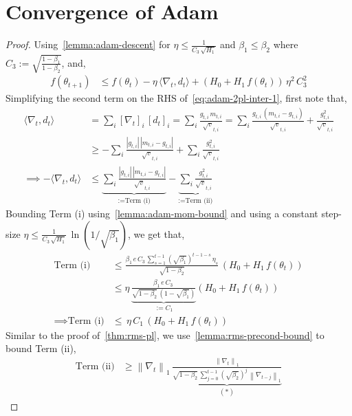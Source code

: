 \documentclass{article}
\newcommand{\ti}[1]{#1_{t,i}}
\newcommand{\norm}[1]{\left\|#1 \right\|}
\newcommand{\tht}{\theta_t}
\newcommand{\thtt}{\theta_{t+1}}
\begin{document}
\section{Convergence of Adam}
\label{app:adam}

\adam*
\begin{proof}
Using~\cref{lemma:adam-descent} for $\eta \leq \frac{1}{C_3 \, \sqrt{H_1}}$ and $\beta_1 \leq \beta_2$ where $C_3 := \sqrt{\frac{1 - \beta_1}{1 - \beta_2}}$, and, 
\begin{align}
f(\thtt) & \leq f(\tht) - \eta \, \langle \nabla_t, d_t \rangle +  \left(H_0 + H_1 \, f(\tht) \right) \, \eta^2 \, C^2_3 \label{eq:adam-2pl-inter-1}    
\end{align}
Simplifying the second term on the RHS of~\cref{eq:adam-2pl-inter-1}, first note that, 
\begin{align}
\langle \nabla_t, d_t \rangle &= \sum_i [\nabla_t]_i \, [d_t]_i = \sum_i \frac{\ti{g} \, \ti{m}}{\ti{\sqrt{v}}} = \sum_i \frac{\ti{g} \, (\ti{m} - \ti{g})}{\ti{\sqrt{v}}} + \frac{\ti{g^2}}{\ti{\sqrt{v}}} \nonumber \\
& \geq -\sum_i \frac{|\ti{g}| \, |\ti{m} - \ti{g}|}{\ti{\sqrt{v}}} + \sum_i \frac{\ti{g^2}}{\ti{\sqrt{v}}} \nonumber \\
\implies - \langle \nabla_t, d_t \rangle & \leq \underbrace{\sum_i \frac{|\ti{g}| \, |\ti{m} - \ti{g}|}{\ti{\sqrt{v}}}}_{:= \text{Term (i)}} - \underbrace{\sum_i \frac{\ti{g^2}}{\ti{\sqrt{v}}}}_{:= \text{Term (ii)}} \label{eq:adam-2pl-secondterm-1}
\end{align}
Bounding Term (i) using~\cref{lemma:adam-mom-bound} and using a constant step-size $\eta \leq \frac{1}{C_3 \, \sqrt{H_1}} \, \ln(1/\sqrt{\beta_1})$, we get that, 
\begin{align}
\text{Term (i)} & \leq  \frac{\beta_1\,e \, C_3 \, \sum_{s = 1}^{t-1} (\sqrt{\beta_1})^{t-1-s} \, \eta_{s}}{\sqrt{1 - \beta_2}} \, (H_0 + H_1 \, f(\tht)) \\
& \leq \eta \, \underbrace{\frac{\beta_1\,e \, C_3 \, }{\sqrt{1 - \beta_2} \, (1 - \sqrt{\beta_1})}}_{:= C_1} (H_0 + H_1 \, f(\tht)) \tag{Since $\eta_s = \eta$ for all $s$} \\
\implies \text{Term (i)} &  \leq \, \eta  \, C_1 \,  (H_0 + H_1 \, f(\tht)) \label{eq:adam-2pl-secondterm-p1} 
\end{align}
Similar to the proof of~\cref{thm:rms-pl}, we use~\cref{lemma:rms-precond-bound} to bound Term (ii), 
\begin{align}
\text{Term (ii)} & \geq \norm{\nabla_t}_1 \, \underbrace{\frac{\norm{\nabla_t}_1}{\sqrt{1 - \beta_2} \, \sum_{j = 0}^{t-1} (\sqrt{\beta_2})^{j} \, \norm{\nabla_{t-j}}_1}}_{(*)} \label{eq:adam-1pl-secondterm} 
\end{align}


\end{proof}
\end{document}
